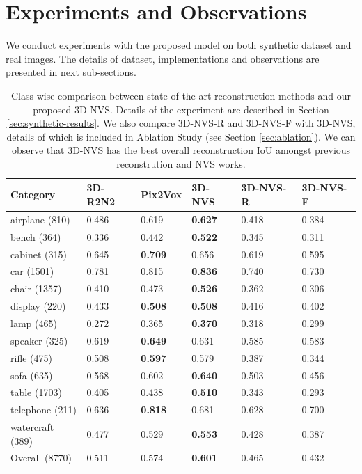 \section{Experiments and Observations}
\label{sec:experiments}
We conduct experiments with the proposed model on both synthetic dataset and real images. The details of dataset, implementations and observations are presented in next sub-sections.

\begin{table}
\begin{center}
{\renewcommand{\arraystretch}{1.1} 
\begin{tabular}{P{0.14\textwidth}P{0.14\textwidth}P{0.14\textwidth}P{0.14\textwidth}P{0.14\textwidth}P{0.14\textwidth}}
\hline
Category & 3D-R2N2 \cite{3dr2n2} & Pix2Vox \cite{pix2vox} & 3D-NVS & 3D-NVS-R & 3D-NVS-F\\
\hline
airplane (810) & 0.486 & 0.619 & \textbf{0.627} & 0.418 & 0.384\\
bench (364) & 0.336 & 0.442 & \textbf{0.522} & 0.345 & 0.311\\
cabinet (315) & 0.645 & \textbf{0.709} & 0.656 & 0.619 & 0.595\\
car (1501) & 0.781 & 0.815 & \textbf{0.836} & 0.740 & 0.730\\
chair (1357) & 0.410 & 0.473 & \textbf{0.526} & 0.362 & 0.306\\
display (220) & 0.433 & \textbf{0.508} & \textbf{0.508} & 0.416 & 0.402\\
lamp (465) & 0.272 & 0.365 & \textbf{0.370} & 0.318 & 0.299\\
speaker (325) & 0.619 & \textbf{0.649} & 0.631 & 0.585 & 0.583\\
rifle (475) & 0.508 & \textbf{0.597} & 0.579 & 0.387 & 0.344\\
sofa (635) & 0.568 & 0.602 & \textbf{0.640} & 0.503 & 0.456\\
table (1703) & 0.405 & 0.438 & \textbf{0.510} & 0.343 & 0.293\\
telephone (211) & 0.636 & \textbf{0.818} & 0.681 & 0.628 & 0.700\\
watercraft (389) & 0.477 & 0.529 & \textbf{0.553} & 0.428 & 0.387\\
\hline 
Overall (8770) & 0.511 & 0.574 & \textbf{0.601} & 0.465 & 0.432\\
\hline
\end{tabular}
}
\end{center}
\caption{Class-wise comparison between state of the art reconstruction methods and our proposed 3D-NVS. Details of the experiment are described in Section \ref{sec:synthetic-results}. We also compare 3D-NVS-R and 3D-NVS-F with 3D-NVS, details of which is included in Ablation Study (see Section \ref{sec:ablation}). We can observe that 3D-NVS has the best overall reconstruction IoU amongst previous reconstrution and NVS works.}
\label{tab:result}
\end{table}

